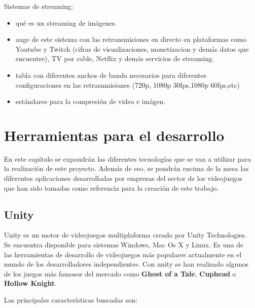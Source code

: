 Sistemas de streaming:
\begin {itemize}
\item qu\'e es un streaming de im\'agenes.
\item auge de este sistema con las retransmisiones en directo en plataformas como Youtube y Twitch (cifras de visualizaciones, monetizacion y dem\'as datos  que encuentre), TV por cable, Netflix y dem\'as servicios de streaming.
\item tabla con diferentes anchos de banda necesarios para diferentes configuraciones en las retrasnmisiones (720p, 1080p 30fps,1080p 60fps,etc)
\item est\'andares para la compresi\'on de video e im\'agen. 
\end {itemize}


\section{Herramientas para el desarrollo}
\label{cap2:sec:herramientas}

En este cap\'itulo se expondr\'an las diferentes tecnolog\'ias que se van a utilizar para la realizaci\'on de este proyecto. Adem\'as de eso, se pondr\'an encima de la mesa las diferentes aplicaciones desarrolladas por empresas del sector de los videojuegos que han sido tomadas como referencia para la creaci\'on de este trabajo. 
\subsection{Unity}
\label{cap2:subsec:unity}

Unity es un motor de videojuegos multiplaforma creado por Unity Technologies. Se encuentra disponible para sistemas Windows, Mac Os X y Linux. Es una de las herramientas de desarrollo de videojuegos m\'as populares actualmente en el mundo de los desarrolladores independientes. Con unity se han realizado algunos de los juegos m\'as famosos del mercado como \textbf{Ghost of a Tale}, \textbf{Cuphead} o  \textbf{Hollow Knight}.

Las principales caracter\'isticas buscadas son:

